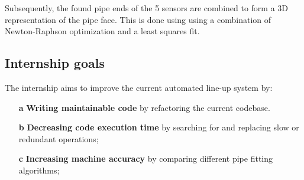 Subsequently, the found pipe ends of the 5 sensors are combined to form a 3D representation of the pipe face.
This is done using using a combination of Newton-Raphson optimization and a least squares fit.

\subsection{Internship goals} \label{ssec:intern_goals}
The internship aims to improve the current automated line-up system by:
\begin{enumerate}
      \item [\textbf{a}] \textbf{Writing maintainable code} by refactoring the current codebase.
      \item [\textbf{b}] \textbf{Decreasing code execution time} by searching for and replacing
            slow or redundant operations;
      \item [\textbf{c}] \textbf{Increasing machine accuracy} by comparing different pipe fitting algorithms;
\end{enumerate}
